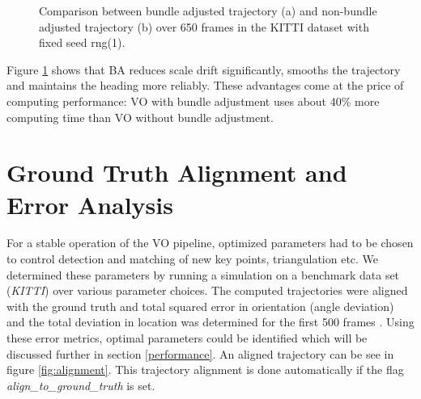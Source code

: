 \begin{figure}[htp]
	\centering
	
	\hspace{2cm}
	\caption{Comparison between bundle adjusted trajectory (a) and non-bundle adjusted trajectory (b) over 650 frames in the KITTI dataset with fixed seed rng(1).}
	\label{fig:BAeffect}
\end{figure}


Figure \ref{fig:BAeffect} shows that BA reduces scale drift significantly, smooths the trajectory and maintains the heading more reliably. These advantages come at the price of computing performance: VO with bundle adjustment uses about 40\% more computing time than VO without bundle adjustment.

\section{Ground Truth Alignment and Error Analysis}
\label{simulation}

For a stable operation of the VO pipeline, optimized parameters had to be chosen to control detection and matching of new key points, triangulation etc. 
We determined these parameters by running a simulation  on a benchmark data set (\emph{KITTI}) over various parameter choices. The computed trajectories were aligned with the ground truth and total squared error in orientation (angle deviation) and the total deviation in location was determined for the first 500 frames . Using these error metrics, optimal parameters could be identified which will be discussed further in section \ref{performance}. An aligned trajectory can be see in figure \ref{fig:alignment}. This trajectory alignment is done automatically if the flag \emph{align_to_ground_truth} is set.

